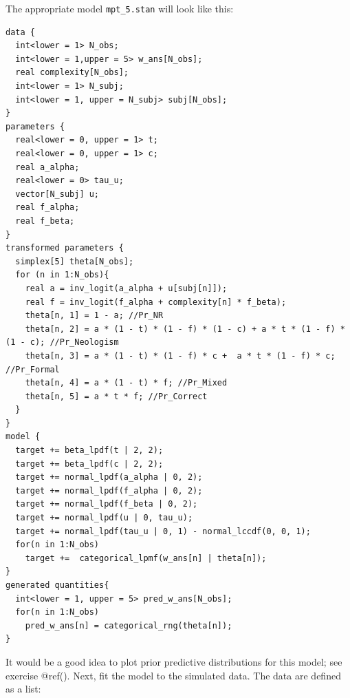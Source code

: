 \documentclass[12pt,]{krantz}
\newenvironment{Shaded}{\begin{snugshade}}{\end{snugshade}}
\newcommand{\DataTypeTok}[1]{\textcolor[rgb]{0.13,0.29,0.53}{#1}}
\newcommand{\KeywordTok}[1]{\textcolor[rgb]{0.13,0.29,0.53}{\textbf{#1}}}
\newcommand{\NormalTok}[1]{#1}
\newcommand{\OperatorTok}[1]{\textcolor[rgb]{0.81,0.36,0.00}{\textbf{#1}}}
\newcommand{\StringTok}[1]{\textcolor[rgb]{0.31,0.60,0.02}{#1}}
\theoremstyle{definition}
\theoremstyle{definition}
\theoremstyle{definition}
\theoremstyle{remark}
\begin{document}
The appropriate model \texttt{mpt\_5.stan} will look like this:

\begin{verbatim}
data {
  int<lower = 1> N_obs;
  int<lower = 1,upper = 5> w_ans[N_obs];
  real complexity[N_obs];
  int<lower = 1> N_subj;
  int<lower = 1, upper = N_subj> subj[N_obs];
}
parameters {
  real<lower = 0, upper = 1> t;
  real<lower = 0, upper = 1> c;
  real a_alpha;
  real<lower = 0> tau_u;
  vector[N_subj] u;
  real f_alpha;
  real f_beta;
}
transformed parameters {
  simplex[5] theta[N_obs];
  for (n in 1:N_obs){
    real a = inv_logit(a_alpha + u[subj[n]]);
    real f = inv_logit(f_alpha + complexity[n] * f_beta);
    theta[n, 1] = 1 - a; //Pr_NR
    theta[n, 2] = a * (1 - t) * (1 - f) * (1 - c) + a * t * (1 - f) * (1 - c); //Pr_Neologism
    theta[n, 3] = a * (1 - t) * (1 - f) * c +  a * t * (1 - f) * c;  //Pr_Formal
    theta[n, 4] = a * (1 - t) * f; //Pr_Mixed
    theta[n, 5] = a * t * f; //Pr_Correct
  }
}
model {
  target += beta_lpdf(t | 2, 2);
  target += beta_lpdf(c | 2, 2);
  target += normal_lpdf(a_alpha | 0, 2);
  target += normal_lpdf(f_alpha | 0, 2);
  target += normal_lpdf(f_beta | 0, 2);
  target += normal_lpdf(u | 0, tau_u);
  target += normal_lpdf(tau_u | 0, 1) - normal_lccdf(0, 0, 1); 
  for(n in 1:N_obs)
    target +=  categorical_lpmf(w_ans[n] | theta[n]);
}
generated quantities{
  int<lower = 1, upper = 5> pred_w_ans[N_obs];
  for(n in 1:N_obs)
    pred_w_ans[n] = categorical_rng(theta[n]);
}
\end{verbatim}

It would be a good idea to plot prior predictive distributions for this model; see exercise @ref().
Next, fit the model to the simulated data. The data are defined as a list:

\begin{Shaded}
\end{Shaded}
\end{document}
